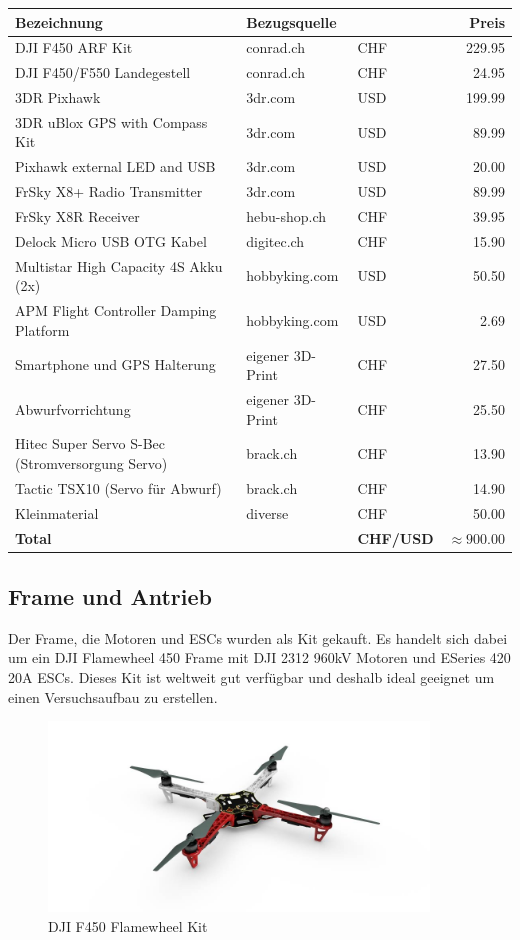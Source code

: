 \begin{tabularx}{\textwidth}{|X|l|l r|}
	\hline
	\textbf{Bezeichnung} & \textbf{Bezugsquelle} && \textbf{Preis}\\
	\hline \hline
	DJI F450 ARF Kit & conrad.ch & CHF &229.95 \\\hline
	DJI F450/F550 Landegestell & conrad.ch & CHF &24.95 \\\hline
	3DR Pixhawk & 3dr.com & USD& 199.99 \\\hline
	3DR uBlox GPS with Compass Kit & 3dr.com & USD &89.99 \\\hline
	Pixhawk external LED and USB & 3dr.com & USD & 20.00 \\\hline
	FrSky X8+ Radio Transmitter & 3dr.com & USD & 89.99 \\\hline
	FrSky X8R Receiver & hebu-shop.ch & CHF & 39.95 \\\hline
	Delock Micro USB OTG Kabel & digitec.ch & CHF &15.90 \\\hline
	Multistar High Capacity 4S Akku (2x) & hobbyking.com & USD& 50.50 \\\hline
	APM Flight Controller Damping Platform & hobbyking.com & USD& 2.69 \\\hline
	Smartphone und GPS Halterung & eigener 3D-Print & CHF &27.50\\\hline
	Abwurfvorrichtung & eigener 3D-Print & CHF &25.50\\\hline
	Hitec Super Servo S-Bec (Stromversorgung Servo) & brack.ch & CHF &13.90\\\hline
	Tactic TSX10 (Servo für Abwurf) & brack.ch & CHF & 14.90\\\hline
	Kleinmaterial & diverse & CHF & 50.00\\\hline
	\hline
	\textbf{Total} & & \textbf{CHF/USD} & $\boldsymbol{\approx 900.00}$\\\hline
\end{tabularx}

\subsection{Frame und Antrieb}

Der Frame, die Motoren und ESCs wurden als Kit gekauft. Es handelt sich dabei um ein DJI Flamewheel 450 Frame mit DJI 2312 960kV Motoren und ESeries 420 20A ESCs. Dieses Kit ist weltweit gut verfügbar und deshalb ideal geeignet um einen Versuchsaufbau zu erstellen.

\begin{figure}[h]
	\centering
	\includegraphics[width=0.9\textwidth] {images/hardware/f450.jpg} 
	\caption{DJI F450 Flamewheel Kit}
	\label{fig:f450}
\end{figure}


